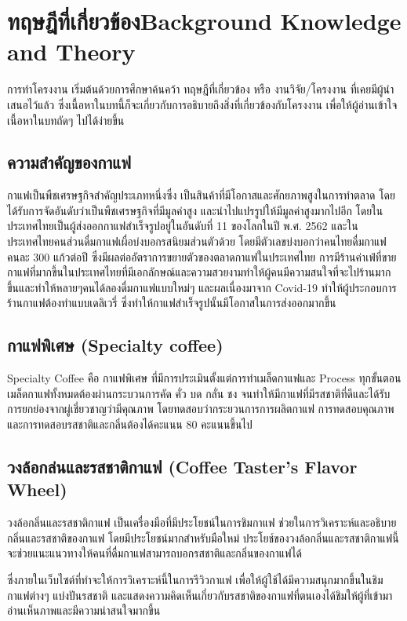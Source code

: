 \chapter{\ifcpe ทฤษฎีที่เกี่ยวข้อง\else Background Knowledge and Theory\fi}

การทำโครงงาน เริ่มต้นด้วยการศึกษาค้นคว้า ทฤษฎีที่เกี่ยวข้อง หรือ งานวิจัย/โครงงาน ที่เคยมีผู้นำเสนอไว้แล้ว ซึ่งเนื้อหาในบทนี้ก็จะเกี่ยวกับการอธิบายถึงสิ่งที่เกี่ยวข้องกับโครงงาน เพื่อให้ผู้อ่านเข้าใจเนื้อหาในบทถัดๆ ไปได้ง่ายขึ้น

\section{ความสำคัญของกาแฟ}
กาแฟเป็นพืชเศรษฐกิจสำคัญประเภทหนึ่งซึ่ง เป็นสินค้าที่มีโอกาสและศักยภาพสูงในการทำตลาด โดยได้รับการจัดอันดับว่าเป็นพืชเศรษฐกิจที่มีมูลค่าสูง และนำไปแปรรูปให้มีมูลค่าสูงมากไปอีก โดยในประเทศไทยเป็นผู้ส่งออกกาแฟสำเร็จรูปอยู่ในอันดับที่ 11 ของโลกในปี พ.ศ. 2562 และในประเทศไทยคนส่วนดื่มกาแฟเผื่อบ่งบอกรสนิยมส่วนตัวด้วย โดยมีตัวเลขบ่งบอกว่าคนไทยดื่มกาแฟคนละ 300 แก้วต่อปี ซึ่งมีผลต่ออัตราการขยายตัวของตลาดกาแฟในประเทศไทย การมีร้านค่าเฟ่ที่ขายกาแฟที่มากขึ้นในประเทศไทยที่มีเอกลักษณ์และความสวยงามทำให้ผู้คนมีความสนใจที่จะไปร้านมากขึ้นและทำให้หลายๆคนได้ลองดื่มกาแฟแบบใหม่ๆ และผลเนื่องมาจาก Covid-19 ทำให้ผู้ประกอบการร้านกาแฟต้องทำแบบเดลิเวรี่ ซึ่งทำให้กาแฟสำเร็จรูปนั้นมีโอกาสในการส่งออกมากขึ้น \cite{growth}

\section{กาแฟพิเศษ (Specialty coffee)}
Specialty Coffee คือ กาแฟพิเศษ ที่มีการประเมินตั้งแต่การทำเมล็ดกาแฟและ Process ทุกขั้นตอน เมล็ดกาแฟทั้งหมดต้องผ่านกระบวนการคัด คั่ว บด กลั่น ชง จนทำให้มีกาแฟที่มีรสชาติที่ดีและได้รับการยกย่องจากผู่เชี่ยวชาญว่ามีคุณภาพ โดยทดสอบว่ากระยวนการการผลิตกาแฟ การทดสอบคุณภาพ และการทดสอบรสชาติและกลิ่นต้องได้คะแนน 80 คะแนนขึ้นไป \cite{special}

\section{วงล้อกล่นและรสชาติกาแฟ (Coffee Taster's Flavor Wheel)}
วงล้อกลิ่นและรสชาติกาแฟ เป็นเครื่องมือที่มีประโยชน์ในการชิมกาแฟ ช่วยในการวิเคราะห์และอธิบายกลิ่นและรสชาติของกาแฟ โดยมีประโยชน์มากสำหรับมือใหม่ ประโยช์ของวงล้อกลิ่นและรสชาติกาแฟนี้ จะช่วยแนะแนวทางให้คนที่ดื่มกาแฟสามารถบอกรสชาติและกลิ่นของกาแฟได้\cite{wheel}

ซึ่งภายในเว็บไซต์ที่ทำจะให้การวิเคราะห์นี้ในการรีวิวกาแฟ เพื่อให้ผู้ใช้ได้มีความสนุกมากขึ้นในชิมกาแฟต่างๆ แบ่งปันรสชาติ และแสดงความคิดเห็นเกี่ยวกับรสชาติของกาแฟที่ตนเองได้ชิมให้ผู้ที่เข้ามาอ่านเห็นภาพและมีความน่าสนใจมากขึ้น

